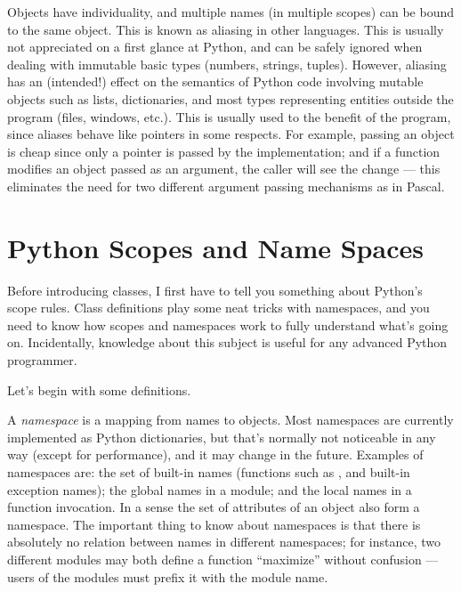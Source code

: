 \documentclass{manual}
\begin{document}
Objects have individuality, and multiple names (in multiple scopes)
can be bound to the same object.  This is known as aliasing in other
languages.  This is usually not appreciated on a first glance at
Python, and can be safely ignored when dealing with immutable basic
types (numbers, strings, tuples).  However, aliasing has an
(intended!) effect on the semantics of Python code involving mutable
objects such as lists, dictionaries, and most types representing
entities outside the program (files, windows, etc.).  This is usually
used to the benefit of the program, since aliases behave like pointers
in some respects.  For example, passing an object is cheap since only
a pointer is passed by the implementation; and if a function modifies
an object passed as an argument, the caller will see the change --- this
eliminates the need for two different argument passing mechanisms as in
Pascal.


\section{Python Scopes and Name Spaces \label{scopes}}

Before introducing classes, I first have to tell you something about
Python's scope rules.  Class definitions play some neat tricks with
namespaces, and you need to know how scopes and namespaces work to
fully understand what's going on.  Incidentally, knowledge about this
subject is useful for any advanced Python programmer.

Let's begin with some definitions.

A \emph{namespace} is a mapping from names to objects.  Most
namespaces are currently implemented as Python dictionaries, but
that's normally not noticeable in any way (except for performance),
and it may change in the future.  Examples of namespaces are: the set
of built-in names (functions such as , and built-in
exception names); the global names in a module; and the local names in
a function invocation.  In a sense the set of attributes of an object
also form a namespace.  The important thing to know about namespaces
is that there is absolutely no relation between names in different
namespaces; for instance, two different modules may both define a
function ``maximize'' without confusion --- users of the modules must
prefix it with the module name.
\end{document}
